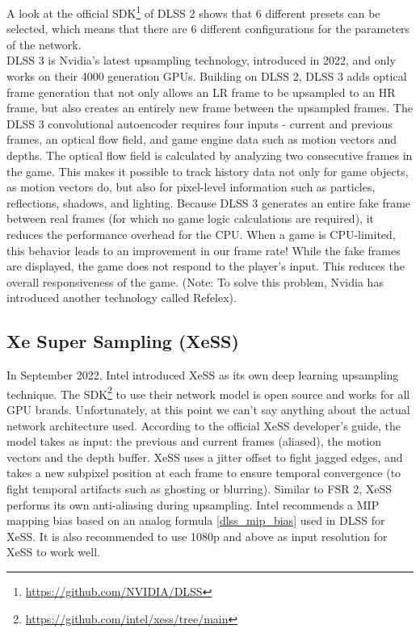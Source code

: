 \documentclass[letterpaper, 10 pt, conference]{ieeeconf}  %
\begin{document}
A look at the official SDK\footnote{\url{https://github.com/NVIDIA/DLSS}} of DLSS 2 shows that 6 different presets can be selected, which means that there are 6 different configurations for the parameters of the network. \\
DLSS 3 is Nvidia's latest upsampling technology, introduced in 2022, and only works on their 4000 generation GPUs.
Building on DLSS 2, DLSS 3 adds optical frame generation that not only allows an LR frame to be upsampled to an HR frame, but also creates an entirely new frame between the upsampled frames.
The DLSS 3 convolutional autoencoder requires four inputs - current and previous frames, an optical flow field, and game engine data such as motion vectors and depths.
The optical flow field is calculated by analyzing two consecutive frames in the game.
This makes it possible to track history data not only for game objects, as motion vectors do, but also for pixel-level information such as particles, reflections, shadows, and lighting.
Because DLSS 3 generates an entire fake frame between real frames (for which no game logic calculations are required), it reduces the performance overhead for the CPU.
When a game is CPU-limited, this behavior leads to an improvement in our frame rate!
While the fake frames are displayed, the game does not respond to the player's input.
This reduces the overall responsiveness of the game.
(Note: To solve this problem, Nvidia has introduced another technology called Refelex).

\subsection{Xe Super Sampling (XeSS)}

In September 2022, Intel introduced XeSS as its own deep learning upsampling technique.
The SDK\footnote{\url{https://github.com/intel/xess/tree/main}} to use their network model is open source and works for all GPU brands.
Unfortunately, at this point we can't say anything about the actual network architecture used.
According to the official XeSS developer's guide, the model takes as input: the previous and current frames (aliased), the motion vectors and the depth buffer.
XeSS uses a jitter offset to fight jagged edges, and takes a new subpixel position at each frame to ensure temporal convergence (to fight temporal artifacts such as ghosting or blurring).
Similar to FSR 2, XeSS performs its own anti-aliasing during upsampling.
Intel recommends a MIP mapping bias based on an analog formula \ref{dlss_mip_bias} used in DLSS for XeSS.
It is also recommended to use 1080p and above as input resolution for XeSS to work well.
\end{document}
